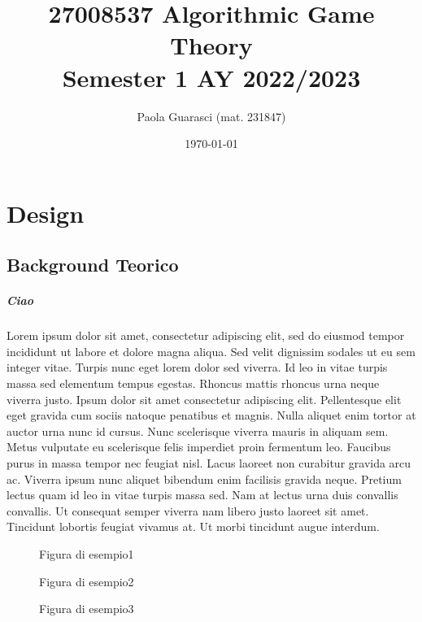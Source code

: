 \documentclass[a4]{report}
\title{27008537 Algorithmic Game Theory \\ \normalsize Semester 1 AY 2022/2023}
\author{Paola Guarasci (mat. 231847)}
\date{\today}
\begin{document}
\maketitle

\tableofcontents


\chapter{Design}
\section{Background Teorico}
\paragraph{Ciao}
Lorem ipsum dolor sit amet, consectetur adipiscing elit, sed do eiusmod tempor incididunt ut labore et dolore magna aliqua. Sed velit dignissim sodales ut eu sem integer vitae. Turpis nunc eget lorem dolor sed viverra. Id leo in vitae turpis massa sed elementum tempus egestas. Rhoncus mattis rhoncus urna neque viverra justo. Ipsum dolor sit amet consectetur adipiscing elit. Pellentesque elit eget gravida cum sociis natoque penatibus et magnis. Nulla aliquet enim tortor at auctor urna nunc id cursus. Nunc scelerisque viverra mauris in aliquam sem. Metus vulputate eu scelerisque felis imperdiet proin fermentum leo. Faucibus purus in massa tempor nec feugiat nisl. Lacus laoreet non curabitur gravida arcu ac. Viverra ipsum nunc aliquet bibendum enim facilisis gravida neque. Pretium lectus quam id leo in vitae turpis massa sed. Nam at lectus urna duis convallis convallis. Ut consequat semper viverra nam libero justo laoreet sit amet. Tincidunt lobortis feugiat vivamus at. Ut morbi tincidunt augue interdum.

\begin{figure}
  \centering
  \caption{Figura di esempio1} \label{fig:1}
  \par
\end{figure}

\begin{figure}
  \centering
  \caption{Figura di esempio2} \label{fig:2}
  \par
\end{figure}
\begin{figure}
  \centering
  \caption{Figura di esempio3} \label{fig:3}
  \par
\end{figure}
\end{document}
